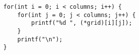 \documentclass[french,a4paper,addpoints,11pt]{exam}
\begin{document}
\begin{multicols}{2}
\begin{questions}
\begin{parts}
\begin{solution}
\begin{lstlisting}
for(int i = 0; i < columns; i++) {
    for(int j = 0; j < columns; j++) {
        printf("%d ", (*grid)[i][j]);
    }
    printf("\n");
}
\end{lstlisting}
\end{solution}
\end{parts}
\end{questions}

\ifprintanswers
\else
\end{multicols}
\fi
\end{document}
